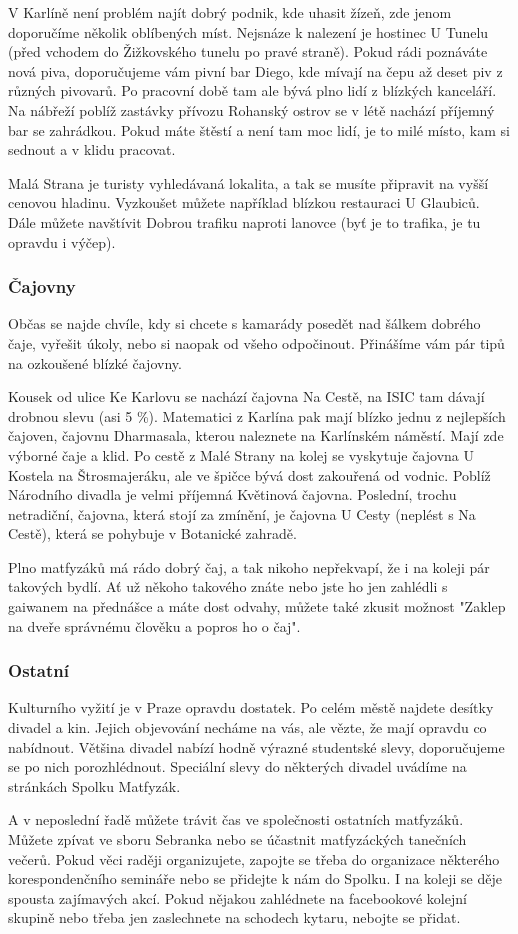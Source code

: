 V Karlíně není problém najít dobrý podnik, kde uhasit žízeň, zde jenom
doporučíme několik oblíbených míst. Nejsnáze k nalezení je hostinec U Tunelu (před
vchodem do Žižkovského tunelu po pravé straně). Pokud rádi poznáváte nová piva,
doporučujeme vám pivní bar Diego, kde mívají na čepu až deset piv z různých
pivovarů. Po pracovní době
tam ale bývá plno lidí z blízkých kanceláří. Na nábřeží poblíž zastávky přívozu
Rohanský ostrov se v létě nachází příjemný bar se zahrádkou. Pokud máte štěstí a není tam moc lidí, je to milé místo, kam si sednout
a v klidu pracovat.

Malá Strana je turisty vyhledávaná lokalita, a tak se musíte připravit na vyšší
cenovou hladinu. Vyzkoušet můžete například blízkou restauraci U Glaubiců. Dále můžete navštívit Dobrou trafiku naproti lanovce (byť je to trafika, je tu opravdu i výčep).


\subsubsection{Čajovny}
Občas se najde chvíle, kdy si chcete s kamarády posedět nad šálkem dobrého čaje,
vyřešit úkoly, nebo si naopak od všeho odpočinout. Přinášíme vám pár tipů na
ozkoušené blízké čajovny.

Kousek od ulice Ke Karlovu se nachází čajovna Na Cestě, na ISIC tam dávají
drobnou slevu (asi 5 \%). Matematici z Karlína pak mají blízko jednu z
nejlepších čajoven, čajovnu Dharmasala, kterou naleznete na Karlínském náměstí.
Mají zde výborné čaje a klid. Po cestě z Malé Strany na kolej se vyskytuje
čajovna U Kostela na Štrosmajeráku, ale ve špičce bývá dost zakouřená od vodnic.
Poblíž Národního divadla je velmi příjemná Květinová čajovna. Poslední, trochu
netradiční, čajovna, která stojí za zmínění, je čajovna U Cesty (neplést s Na
Cestě), která se pohybuje v Botanické zahradě.

Plno matfyzáků má rádo dobrý čaj, a tak nikoho nepřekvapí, že i na koleji pár
takových bydlí. Ať už někoho takového znáte nebo jste ho jen zahlédli s gaiwanem
na přednášce a máte dost odvahy, můžete také zkusit možnost "Zaklep na dveře
správnému člověku a popros ho o čaj".


\subsubsection{Ostatní}
Kulturního vyžití je v Praze opravdu dostatek. Po celém městě najdete desítky
divadel a kin. Jejich objevování necháme na vás, ale vězte, že mají opravdu co
nabídnout. Většina divadel nabízí hodně výrazné studentské slevy, doporučujeme
se po nich porozhlédnout. Speciální slevy do některých divadel uvádíme na
stránkách Spolku Matfyzák.

A v neposlední řadě můžete trávit čas ve společnosti ostatních matfyzáků. Můžete
zpívat ve sboru Sebranka nebo se účastnit matfyzáckých tanečních večerů. Pokud
věci raději organizujete, zapojte se třeba do organizace některého
korespondenčního semináře nebo se přidejte k nám do Spolku. I na koleji se děje
spousta zajímavých akcí. Pokud nějakou zahlédnete na facebookové kolejní skupině
nebo třeba jen zaslechnete na schodech kytaru, nebojte se přidat.
